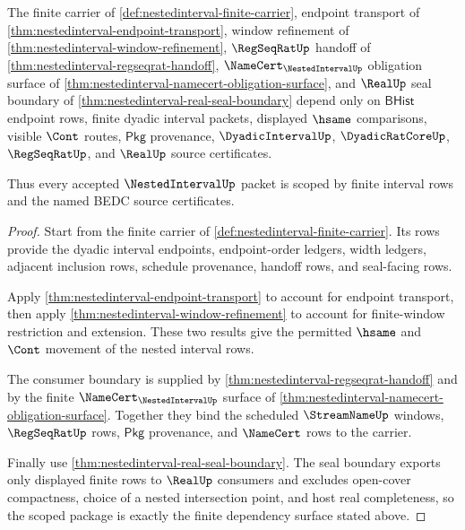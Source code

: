 \begin{theorem}
\label{thm:nestedinterval-obligation-scope-packet}
The finite carrier of \autoref{def:nestedinterval-finite-carrier}, endpoint
transport of \autoref{thm:nestedinterval-endpoint-transport}, window refinement
of \autoref{thm:nestedinterval-window-refinement}, $\RegSeqRatUp$ handoff of
\autoref{thm:nestedinterval-regseqrat-handoff}, $\NameCert_{\NestedIntervalUp}$
obligation surface of
\autoref{thm:nestedinterval-namecert-obligation-surface}, and $\RealUp$ seal
boundary of \autoref{thm:nestedinterval-real-seal-boundary} depend only on
$\mathsf{BHist}$ endpoint rows, finite dyadic interval packets, displayed
$\hsame$ comparisons, visible $\Cont$ routes, $\mathsf{Pkg}$ provenance,
$\DyadicIntervalUp$, $\DyadicRatCoreUp$, $\RegSeqRatUp$, and $\RealUp$ source
certificates.

Thus every accepted $\NestedIntervalUp$ packet is scoped by finite interval
rows and the named BEDC source certificates.
\end{theorem}
\begin{proof}
Start from the finite carrier of \autoref{def:nestedinterval-finite-carrier}.
Its rows provide the dyadic interval endpoints, endpoint-order ledgers, width
ledgers, adjacent inclusion rows, schedule provenance, handoff rows, and
seal-facing rows.

Apply \autoref{thm:nestedinterval-endpoint-transport} to account for endpoint
transport, then apply \autoref{thm:nestedinterval-window-refinement} to account
for finite-window restriction and extension. These two results give the
permitted $\hsame$ and $\Cont$ movement of the nested interval rows.

The consumer boundary is supplied by
\autoref{thm:nestedinterval-regseqrat-handoff} and by the finite
$\NameCert_{\NestedIntervalUp}$ surface of
\autoref{thm:nestedinterval-namecert-obligation-surface}. Together they bind
the scheduled $\StreamNameUp$ windows, $\RegSeqRatUp$ rows, $\mathsf{Pkg}$
provenance, and $\NameCert$ rows to the carrier.

Finally use \autoref{thm:nestedinterval-real-seal-boundary}. The seal boundary
exports only displayed finite rows to $\RealUp$ consumers and excludes
open-cover compactness, choice of a nested intersection point, and host real
completeness, so the scoped package is exactly the finite dependency surface
stated above.
\end{proof}

